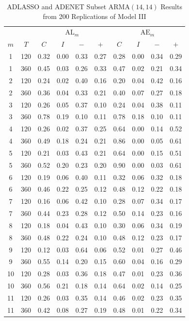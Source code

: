 \begin{table}[htbp]
\footnotesize
\centering
\caption{ADLASSO and ADENET Subset ARMA$(14,14)$ Results from 200 Replications of Model III}
\begin{tabular}{cc|cccc|cccc}
  \hline
    & & \multicolumn{4}{c|}{$\textrm{AL}_m$} & \multicolumn{4}{c}{$\textrm{AE}_m$} \\
      \cline{4-5}  \cline{8-9}
  $m$ & $T$ & $C$ & $I$ & $-$ & $+$ & $C$ & $I$ & $-$ & $+$ \\
  \hline
  1 & 120 & 0.32 & 0.00 & 0.33 & 0.27 & 0.28 & 0.00 & 0.34 & 0.29 \\ 
  1 & 360 & 0.45 & 0.03 & 0.26 & 0.33 & 0.47 & 0.02 & 0.21 & 0.34 \\ 
  2 & 120 & 0.24 & 0.02 & 0.40 & 0.16 & 0.20 & 0.04 & 0.42 & 0.16 \\ 
  2 & 360 & 0.36 & 0.04 & 0.33 & 0.21 & 0.40 & 0.07 & 0.27 & 0.18 \\ 
  3 & 120 & 0.26 & 0.05 & 0.37 & 0.10 & 0.24 & 0.04 & 0.38 & 0.11 \\ 
  3 & 360 & 0.78 & 0.19 & 0.10 & 0.11 & 0.78 & 0.18 & 0.10 & 0.11 \\ 
  \hline
  4 & 120 & 0.26 & 0.02 & 0.37 & 0.25 & 0.64 & 0.00 & 0.14 & 0.52 \\ 
  4 & 360 & 0.49 & 0.18 & 0.24 & 0.21 & 0.86 & 0.00 & 0.05 & 0.61 \\ 
  5 & 120 & 0.21 & 0.03 & 0.43 & 0.21 & 0.64 & 0.00 & 0.15 & 0.51 \\ 
  5 & 360 & 0.52 & 0.20 & 0.23 & 0.20 & 0.90 & 0.00 & 0.03 & 0.61 \\ 
  \hline
  6 & 120 & 0.19 & 0.06 & 0.40 & 0.11 & 0.32 & 0.06 & 0.32 & 0.18 \\ 
  6 & 360 & 0.46 & 0.22 & 0.25 & 0.12 & 0.48 & 0.12 & 0.22 & 0.18 \\ 
  7 & 120 & 0.16 & 0.06 & 0.42 & 0.10 & 0.28 & 0.07 & 0.34 & 0.17 \\ 
  7 & 360 & 0.44 & 0.23 & 0.28 & 0.12 & 0.50 & 0.14 & 0.23 & 0.16 \\ 
  8 & 120 & 0.18 & 0.04 & 0.43 & 0.10 & 0.30 & 0.06 & 0.34 & 0.19 \\ 
  8 & 360 & 0.48 & 0.22 & 0.24 & 0.10 & 0.48 & 0.12 & 0.23 & 0.17 \\ 
  \hline
  9 & 120 & 0.12 & 0.03 & 0.64 & 0.06 & 0.52 & 0.01 & 0.27 & 0.46 \\ 
  9 & 360 & 0.55 & 0.14 & 0.20 & 0.15 & 0.60 & 0.04 & 0.16 & 0.29 \\ 
  10 & 120 & 0.28 & 0.03 & 0.36 & 0.18 & 0.47 & 0.01 & 0.23 & 0.36 \\ 
  10 & 360 & 0.56 & 0.21 & 0.18 & 0.14 & 0.64 & 0.02 & 0.14 & 0.25 \\ 
  11 & 120 & 0.26 & 0.03 & 0.35 & 0.14 & 0.46 & 0.02 & 0.23 & 0.35 \\ 
  11 & 360 & 0.42 & 0.08 & 0.27 & 0.19 & 0.48 & 0.01 & 0.22 & 0.34 \\ 
   \hline
\end{tabular}
\label{tab:alaemod3}
\end{table}

